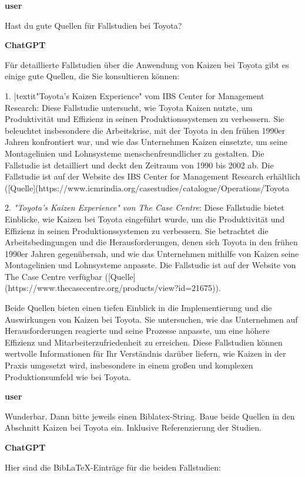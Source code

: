 \textbf{user}

Hast du gute Quellen für Fallstudien bei Toyota?

\textbf{ChatGPT}

Für detaillierte Fallstudien über die Anwendung von Kaizen bei Toyota gibt es einige gute Quellen, die Sie konsultieren können:

1. |textit{"Toyota's Kaizen Experience" vom IBS Center for Management Research}: Diese Fallstudie untersucht, wie Toyota Kaizen nutzte, um Produktivität und Effizienz in seinen Produktionssystemen zu verbessern. Sie beleuchtet insbesondere die Arbeitskrise, mit der Toyota in den frühen 1990er Jahren konfrontiert war, und wie das Unternehmen Kaizen einsetzte, um seine Montagelinien und Lohnsysteme menschenfreundlicher zu gestalten. Die Fallstudie ist detailliert und deckt den Zeitraum von 1990 bis 2002 ab. Die Fallstudie ist auf der Website des IBS Center for Management Research erhältlich ([Quelle](https://www.icmrindia.org/casestudies/catalogue/Operations/Toyota%

2. \textit{"Toyota's Kaizen Experience" von The Case Centre}: Diese Fallstudie bietet Einblicke, wie Kaizen bei Toyota eingeführt wurde, um die Produktivität und Effizienz in seinen Produktionssystemen zu verbessern. Sie betrachtet die Arbeitsbedingungen und die Herausforderungen, denen sich Toyota in den frühen 1990er Jahren gegenübersah, und wie das Unternehmen mithilfe von Kaizen seine Montagelinien und Lohnsysteme anpasste. Die Fallstudie ist auf der Website von The Case Centre verfügbar ([Quelle](https://www.thecasecentre.org/products/view?id=21675)).

Beide Quellen bieten einen tiefen Einblick in die Implementierung und die Auswirkungen von Kaizen bei Toyota. Sie untersuchen, wie das Unternehmen auf Herausforderungen reagierte und seine Prozesse anpasste, um eine höhere Effizienz und Mitarbeiterzufriedenheit zu erreichen. Diese Fallstudien können wertvolle Informationen für Ihr Verständnis darüber liefern, wie Kaizen in der Praxis umgesetzt wird, insbesondere in einem großen und komplexen Produktionsumfeld wie bei Toyota.

\textbf{user}

Wunderbar. Dann bitte jeweils einen Biblatex-String. Baue beide Quellen in den Abschnitt Kaizen bei Toyota ein. Inklusive Referenzierung der Studien.

\textbf{ChatGPT}

Hier sind die BibLaTeX-Einträge für die beiden Fallstudien:

